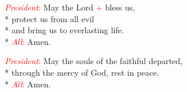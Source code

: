 \documentclass[letterpaper,14pt]{extarticle}
\newcommand{\sidestar}[1]{\textcolor{red}{\textit{#1}:}}
\newcommand{\rednote}[1]{\textcolor{red}{#1}}
\begin{document}

\sidestar{President}
May the Lord \rednote{+} bless us, \\*
protect us from all evil \\*
and bring us to everlasting life. \\*
\sidestar{All} Amen.

\sidestar{President}
May the souls of the faithful departed,  \\*
through the mercy of God, rest in peace. \\*
\sidestar{All} Amen.
\end{document}
